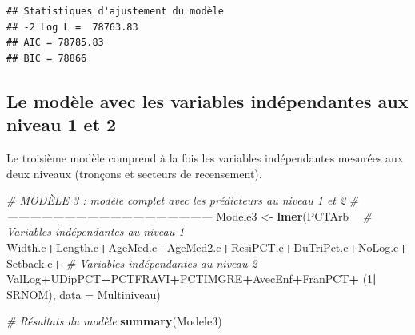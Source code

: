 \documentclass[
  11pt,
  french,
]{book}
\makeatletter
\newenvironment{Shaded}{\begin{snugshade}}{\end{snugshade}}
\newcommand{\CommentTok}[1]{\textcolor[rgb]{0.56,0.35,0.01}{\textit{#1}}}
\newcommand{\DataTypeTok}[1]{\textcolor[rgb]{0.13,0.29,0.53}{#1}}
\newcommand{\DecValTok}[1]{\textcolor[rgb]{0.00,0.00,0.81}{#1}}
\newcommand{\KeywordTok}[1]{\textcolor[rgb]{0.13,0.29,0.53}{\textbf{#1}}}
\newcommand{\NormalTok}[1]{#1}
\newcommand{\OperatorTok}[1]{\textcolor[rgb]{0.81,0.36,0.00}{\textbf{#1}}}
\newcommand{\StringTok}[1]{\textcolor[rgb]{0.31,0.60,0.02}{#1}}
\newenvironment{kframe}{%
\medskip{}
\setlength{\fboxsep}{.8em}
 \def\at@end@of@kframe{}%
 \ifinner\ifhmode%
  \def\at@end@of@kframe{\end{minipage}}%
  \begin{minipage}{\columnwidth}%
 \fi\fi%
 \def\FrameCommand##1{\hskip\@totalleftmargin \hskip-\fboxsep
 \colorbox{shadecolor}{##1}\hskip-\fboxsep
     \hskip-\linewidth \hskip-\@totalleftmargin \hskip\columnwidth}%
 \MakeFramed {\advance\hsize-\width
   \@totalleftmargin\z@ \linewidth\hsize
   \@setminipage}}%
 {\par\unskip\endMakeFramed%
 \at@end@of@kframe}
\renewenvironment{Shaded}{\begin{kframe}}{\end{kframe}}
\makeatother
\begin{document}
\begin{verbatim}
## Statistiques d'ajustement du modèle 
## -2 Log L =  78763.83 
## AIC = 78785.83 
## BIC = 78866
\end{verbatim}

\hypertarget{sect08413}{%
\subsection{Le modèle avec les variables indépendantes aux niveau 1 et 2}\label{sect08413}}

Le troisième modèle comprend à la fois les variables indépendantes mesurées aux deux niveaux (tronçons et secteurs de recensement).

\begin{Shaded}
\begin{Highlighting}[]
\CommentTok{# MODÈLE 3 : modèle complet avec les prédicteurs au niveau 1 et 2}
\CommentTok{# ------------------------------------------------------}
\NormalTok{Modele3 <-}\StringTok{ }\KeywordTok{lmer}\NormalTok{(PCTArb }\OperatorTok{~}
\StringTok{                  }\CommentTok{# Variables indépendantes au niveau 1}
\StringTok{                   }\NormalTok{Width.c}\OperatorTok{+}\NormalTok{Length.c}\OperatorTok{+}\NormalTok{AgeMed.c}\OperatorTok{+}\NormalTok{AgeMed2.c}\OperatorTok{+}\NormalTok{ResiPCT.c}\OperatorTok{+}\NormalTok{DuTriPct.c}\OperatorTok{+}\NormalTok{NoLog.c}\OperatorTok{+}\NormalTok{Setback.c}\OperatorTok{+}
\StringTok{                  }\CommentTok{# Variables indépendantes au niveau 2}
\StringTok{                  }\NormalTok{ValLog}\OperatorTok{+}\NormalTok{UDipPCT}\OperatorTok{+}\NormalTok{PCTFRAVI}\OperatorTok{+}\NormalTok{PCTIMGRE}\OperatorTok{+}\NormalTok{AvecEnf}\OperatorTok{+}\NormalTok{FranPCT}\OperatorTok{+}
\StringTok{                  }\NormalTok{(}\DecValTok{1}\OperatorTok{|}\StringTok{ }\NormalTok{SRNOM), }\DataTypeTok{data =}\NormalTok{ Multiniveau)}

\CommentTok{# Résultats du modèle}
\KeywordTok{summary}\NormalTok{(Modele3)}
\end{Highlighting}
\end{Shaded}
\end{document}
